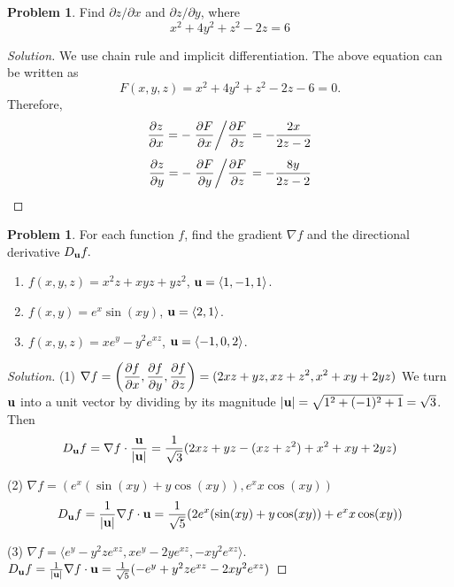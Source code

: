 \documentclass[12pt]{amsart}%
\theoremstyle{plain}
\theoremstyle{definition}
\newtheorem{prob}[theorem]{Problem}
\newcommand{\p}[0]{\partial}
\theoremstyle{special}
\newcommand{\sol}[1]{
{\begin{proof}[Solution]#1\end{proof}}
}
\newcommand{\Prob}[1]{\begin{tcolorbox}%
\begin{prob}
	#1
\end{prob}
\end{tcolorbox}	
}
\begin{document}
\Prob{Find $\partial z/\partial x$ and $\partial z/ \partial y$, where
\[x^2+4y^2+z^2-2z=6\]
}
\sol{We use chain rule and implicit differentiation. The above equation can be written as%
\[F(x,y,z)=x^2+4y^2+z^2-2z-6=0.\]
Therefore, 
\[{\p z\over \p x}=-\left. {\p F\over \p x} \middle/{\p F\over \p z} \right. =-{ 2x\over 2z-2} \]
\[{\p z\over\p y}=-\left.{\p F\over\p y }\middle/{\p F\over\p z}\right.=-{8y\over 2z-2}\qedhere\]
}%
\Prob{For each function $f$, find the gradient $ \nabla f$ and the directional derivative $D_{\bf u}f.$
\begin{enumerate}
\item $f(x,y,z)=x^2z+xyz+yz^2$, ${\bf u}=\langle 1,-1,1 \rangle$.
\item $f(x,y)=e^{x}\sin(xy)$, ${\bf u}=\langle 2,1\rangle$.
\item $f(x,y,z)=xe^y-y^2e^{xz}$, ${\bf u}=\langle -1,0,2\rangle$.
\end{enumerate}
}
\sol{(1) $\displaystyle \nabla f = \left({\p f\over \p x},{\p f\over\p y},{\p f\over\p z}\right)=(2xz+yz,xz+z^2,x^2+xy+2yz)$
We turn ${\bf u}$ into a unit vector by dividing by its magnitude $|{\bf u}|=\sqrt{1^2+(-1)^2+1}=\sqrt{3}$. Then
\[D_{\bf u}f=\nabla f\cdot{{\bf u}\over{|{\bf u}|}}={1\over \sqrt{3}}(2xz+yz-(xz+z^2)+x^2+xy+2yz)\]
	
(2) $\displaystyle\nabla f= \left(e^x (\sin(x y) + y \cos(x y)), e^xx\cos(xy)\right)$ $$D_{\bf u}f={1\over |{\bf u}|}\nabla f\cdot {\bf u}={1\over\sqrt{5} }(2e^x (\sin(x y) + y \cos(x y))+e^xx\cos(xy))$$

(3) $\nabla f=\langle e^y - y^2 z e^{x z}, x e^y - 2 y e^{x z}, -x y^2e^{x z}\rangle $. 
\( D_{\bf u} f={1\over |{\bf u}|}\nabla f\cdot {\bf u}= {1\over \sqrt{5}}(-e^y+y^2ze^{xz}-2xy^2e^{xz})\)
	}
\end{document}
